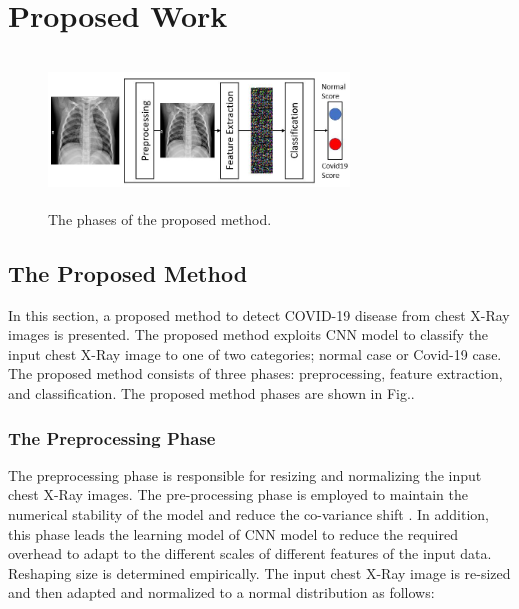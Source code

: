 
\chapter{Proposed Work} %

\label{chp:proposed} %




\begin{figure}[th]
    \centering

    \includegraphics[height=40mm,width=8.0cm]{Figures/fig1.jpg}
    \caption{The phases of the proposed method.}
    \label{fig1}
    \end{figure}

\section{The Proposed Method}
In this section,  a  proposed  method to detect COVID-19 disease from chest X-Ray images is presented. The proposed method exploits CNN model to classify the input chest X-Ray image to one of two categories; normal case or Covid-19 case. The proposed method consists of three phases: preprocessing, feature extraction, and classification. The proposed method phases are shown in Fig.. 

\subsection{The Preprocessing Phase}

The preprocessing phase is responsible for resizing and normalizing the  input  chest X-Ray images. The pre-processing phase is employed to maintain the numerical stability of the model and reduce the co-variance shift \cite{lecun1989handwritten}. In addition, this phase leads the learning model of CNN model to reduce  the required overhead to adapt to the different scales of different features of the input data. Reshaping size is determined empirically. The input  chest X-Ray image is re-sized and then  adapted and normalized to a normal distribution as follows:

